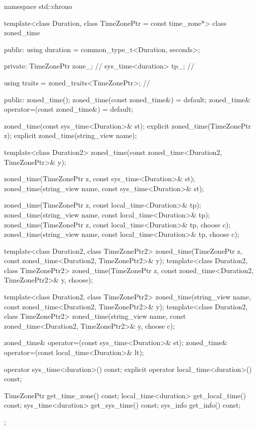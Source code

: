 \begin{codeblock}
namespace std::chrono {
  template<class Duration, class TimeZonePtr = const time_zone*>
  class zoned_time {
  public:
    using duration = common_type_t<Duration, seconds>;

  private:
    TimeZonePtr        zone_;                   // \expos
    sys_time<duration> tp_;                     // \expos

    using traits = zoned_traits<TimeZonePtr>;   // \expos

  public:
    zoned_time();
    zoned_time(const zoned_time&) = default;
    zoned_time& operator=(const zoned_time&) = default;

    zoned_time(const sys_time<Duration>& st);
    explicit zoned_time(TimeZonePtr z);
    explicit zoned_time(string_view name);

    template<class Duration2>
      zoned_time(const zoned_time<Duration2, TimeZonePtr>& y);

    zoned_time(TimeZonePtr z,    const sys_time<Duration>& st);
    zoned_time(string_view name, const sys_time<Duration>& st);

    zoned_time(TimeZonePtr z,    const local_time<Duration>& tp);
    zoned_time(string_view name, const local_time<Duration>& tp);
    zoned_time(TimeZonePtr z,    const local_time<Duration>& tp, choose c);
    zoned_time(string_view name, const local_time<Duration>& tp, choose c);

    template<class Duration2, class TimeZonePtr2>
      zoned_time(TimeZonePtr z, const zoned_time<Duration2, TimeZonePtr2>& y);
    template<class Duration2, class TimeZonePtr2>
      zoned_time(TimeZonePtr z, const zoned_time<Duration2, TimeZonePtr2>& y, choose);

    template<class Duration2, class TimeZonePtr2>
      zoned_time(string_view name, const zoned_time<Duration2, TimeZonePtr2>& y);
    template<class Duration2, class TimeZonePtr2>
      zoned_time(string_view name, const zoned_time<Duration2, TimeZonePtr2>& y, choose c);

    zoned_time& operator=(const sys_time<Duration>& st);
    zoned_time& operator=(const local_time<Duration>& lt);

    operator sys_time<duration>() const;
    explicit operator local_time<duration>() const;

    TimeZonePtr          get_time_zone()  const;
    local_time<duration> get_local_time() const;
    sys_time<duration>   get_sys_time()   const;
    sys_info             get_info()       const;
  };

}
\end{codeblock}
